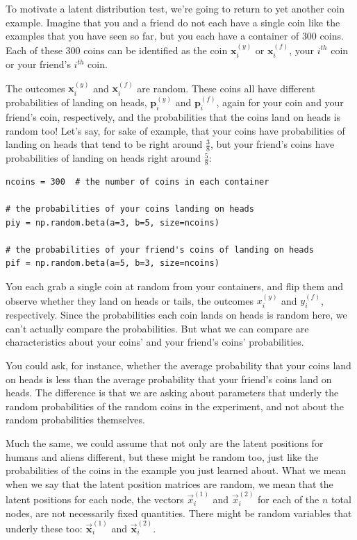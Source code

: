 To motivate a latent distribution test, we're going to return to yet another coin example. Imagine that you and a friend do not each have a single coin like the examples that you have seen so far, but you each have a container of $300$ coins. Each of these $300$ coins can be identified as the coin $\mathbf x_i^{(y)}$ or $\mathbf x_i^{(f)}$, your $i^{th}$ coin or your friend's $i^{th}$ coin. 

The outcomes $\mathbf x_i^{(y)}$ and $\mathbf x_i^{(f)}$ are random. These coins all have different probabilities of landing on heads, $\mathbf p_i^{(y)}$ and $\mathbf p_i^{(f)}$, again for your coin and your friend's coin, respectively, and the probabilities that the coins land on heads is random too! Let's say, for sake of example, that your coins have probabilities of landing on heads that tend to be right around $\frac{3}{8}$, but your friend's coins have probabilities of landing on heads right around $\frac{5}{8}$:

\begin{lstlisting}[style=python]
ncoins = 300  # the number of coins in each container

# the probabilities of your coins landing on heads
piy = np.random.beta(a=3, b=5, size=ncoins)

# the probabilities of your friend's coins of landing on heads
pif = np.random.beta(a=5, b=3, size=ncoins)
\end{lstlisting}
You each grab a single coin at random from your containers, and flip them and observe whether they land on heads or tails, the outcomes $x_i^{(y)}$ and $y_i^{(f)}$, respectively. Since the probabilities each coin lands on heads is random here, we can't actually compare the probabilities. But what we can compare are characteristics about your coins' and your friend's coins' probabilities. 

You could ask, for instance, whether the average probability that your coins land on heads is less than the average probability that your friend's coins land on heads. The difference is that we are asking about parameters that underly the random probabilities of the random coins in the experiment, and not about the random probabilities themselves.

Much the same, we could assume that not only are the latent positions for humans and aliens different, but these might be random too, just like the probabilities of the coins in the example you just learned about. What we mean when we say that the latent position matrices are random, we mean that the latent positions for each node, the vectors $\vec x_i^{(1)}$ and $\vec x_i^{(2)}$ for each of the $n$ total nodes, are not necessarily fixed quantities. There might be random variables that underly these too: $\mathbf{\vec x}_i^{(1)}$ and $\mathbf{\vec x}_i^{(2)}$. 

